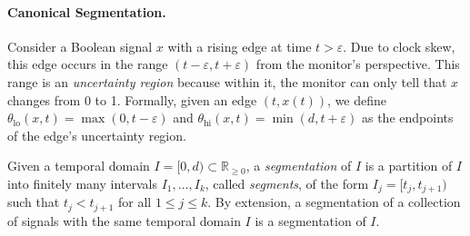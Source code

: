 \documentclass[iicol,lineno]{sn-jnl}
\newcommand{\R}{\mathbb{R}}
\newcommand{\?}{\text{?}}
\newtheorem{remark}{Remark}
\begin{document}
	
	\paragraph*{Canonical Segmentation.}
	Consider a Boolean signal $x$ with a rising edge at time $t > \varepsilon$.
	Due to clock skew, this edge occurs in the range $(t - \varepsilon, t + \varepsilon)$ from the monitor's perspective.
	This range is an \emph{uncertainty region} because within it, the monitor can only tell that $x$ changes from 0 to 1. Formally, given an edge $(t, x(t))$, we define $\theta_{\text{lo}}(x,t) = \max(0, t - \varepsilon)$ and $\theta_{\text{hi}}(x,t) = \min(d, t + \varepsilon)$ as the endpoints of the edge's uncertainty region.
	
	Given a temporal domain $I = [0,d) \subset \R_{\geq 0}$, a \emph{segmentation} of $I$ is a partition of $I$ into finitely many intervals $I_1, \ldots, I_k$, called \emph{segments}, of the form $I_j = [t_j, t_{j+1})$ such that $t_j < t_{j+1}$ for all $1 \leq j \leq k$.
	By extension, a segmentation of a collection of signals with the same temporal domain $I$ is a segmentation of $I$.
	
	
\end{document}
